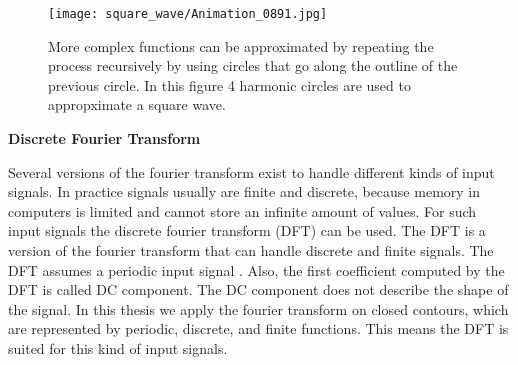 \documentclass[thesis.tex]{subfiles}
\begin{document}
\begin{figure}[h]
\centering
\texttt{[image: square\_wave/Animation\_0891.jpg]}
\caption{More complex functions can be approximated by repeating the process recursively by using circles that go along the outline of the previous circle. In this figure 4 harmonic circles are used to appropximate a square wave.}
\label{fig:fourier_square}
\end{figure}

\textbf{Discrete Fourier Transform}

Several versions of the fourier transform exist to handle different kinds of input signals. In practice signals usually are finite and discrete, because memory in computers is limited and cannot store an infinite amount of values. For such input signals the discrete fourier transform (DFT) can be used. The DFT is a version of the fourier transform that can handle discrete and finite signals. The DFT assumes a periodic input signal \cite{dspguide}. Also, the first coefficient computed by the DFT is called DC component. The DC component does not describe the shape of the signal. In this thesis we apply the fourier transform on closed contours, which are represented by periodic, discrete, and finite functions. This means the DFT is suited for this kind of input signals.
\newpage



\end{document}
